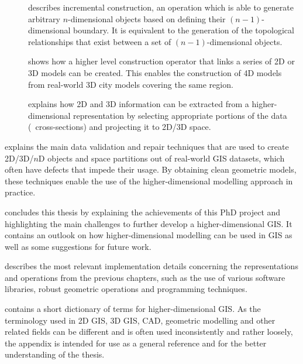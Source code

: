 \begin{description}
\begin{description}
\item[]
describes incremental construction, an operation which is able to generate arbitrary $n$-dimensional objects based on defining their $(n-1)$-dimensional boundary.
It is equivalent to the generation of the topological relationships that exist between a set of $(n-1)$-dimensional objects.

\item[]
shows how a higher level construction operator that links a series of 2D or 3D models can be created.
This enables the construction of 4D models from real-world 3D city models covering the same region.

\item[]
explains how 2D and 3D information can be extracted from a higher-dimensional representation by selecting appropriate portions of the data (\eg\ cross-sections) and projecting it to 2D/3D space.

\end{description}


\item[\refch{ch:cleaning}]
explains the main data validation and repair techniques that are used to create 2D/3D/$n$D objects and space partitions out of real-world GIS datasets, which often have defects that impede their usage.
By obtaining clean geometric models, these techniques enable the use of the higher-dimensional modelling approach in practice.


\item[\refch{ch:conclusions}]
concludes this thesis by explaining the achievements of this PhD project and highlighting the main challenges to further develop a higher-dimensional GIS.\@
It contains an outlook on how higher-dimensional modelling can be used in GIS as well as some suggestions for future work.

\item[\refap{ch:implementation}]
describes the most relevant implementation details concerning the representations and operations from the previous chapters, such as the use of various software libraries, robust geometric operations and programming techniques.

\clearpage
\item[\refap{ch:dictionary}] 
contains a short dictionary of terms for higher-dimensional GIS.\@
As the terminology used in 2D GIS, 3D GIS, CAD, geometric modelling and other related fields can be different and is often used inconsistently and rather loosely, the appendix is intended for use as a general reference and for the better understanding of the thesis.

\end{description}
